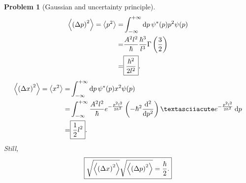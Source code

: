 \documentclass{article}
\theoremstyle{1}
\newtheorem{problem}{Problem}
\begin{document}
\begin{problem}[Gaussian and uncertainty principle]
    \begin{align}
       \expval{\left(\Delta p\right)^2}=\expval{p^2}=&\int_{-\infty}^{+\infty}\dd{p}\psi^*(p)p^2\psi(p)\notag\\ 
       =&\frac{A^2l^2}{\hbar}\frac{\hbar^3}{l^3}\Gamma\left(\frac{3}{2}\right)\notag\\
       =&\boxed{\frac{\hbar^2}{2l^2}}.
    \end{align}
    \begin{align}
        \expval{\left(\Delta x\right)^2}=\expval{x^2}=&\int_{-\infty}^{+\infty}\dd{p}\psi^*(p)x^2\psi(p)\notag\\
        =&\int_{-\infty}^{+\infty}\frac{A^2l^2}{\hbar}e^{-\frac{p^2l^2}{2\hbar^2}}\left(-\hbar^2\frac{\dd^2}{\dd{p^2}}\right)´e^{-\frac{p^2l^2}{2\hbar^2}}\dd{p}\notag\\
        =&\boxed{\frac{1}{2}l^2}.
    \end{align}
    Still,
    \begin{equation}
        \boxed{\sqrt{\expval{\left(\Delta x\right)^2}}\sqrt{\expval{\left(\Delta p\right)^2}}=\frac{\hbar}{2}.}
    \end{equation}
\end{problem}
\end{document}
